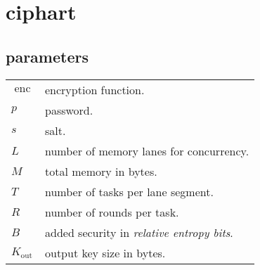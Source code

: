 \documentclass[twocolumn]{article}
\DeclareMathOperator{\enc}{enc}
\begin{document}

\section{ciphart}
\subsection{parameters}
\begin{tabularx}{\columnwidth}{lX}
    $\enc$ & encryption function.\\
    $p$ & password.\\
    $s$ & salt.\\
    $L$ & number of memory lanes for concurrency.\\
    $M$ & total memory in bytes.\\
    $T$ & number of tasks per lane segment.\\
    $R$ & number of rounds per task.\\
    $B$ & added security in \emph{relative entropy bits}.\\
    $K_{\text{out}}$ & output key size in bytes.\\
\end{tabularx}
\end{document}

